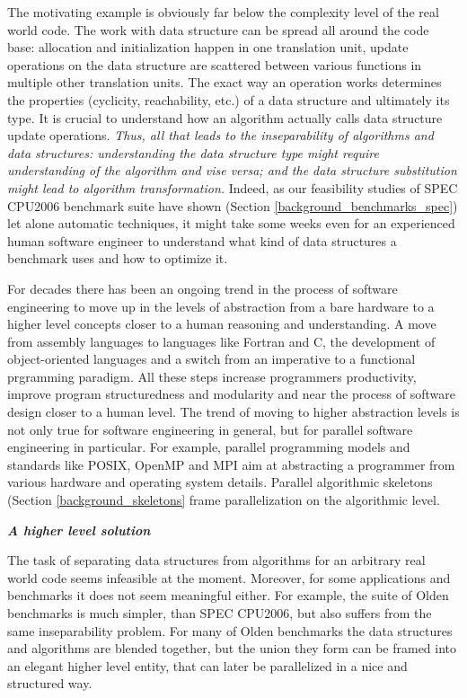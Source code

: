 \begin{description}[style=unboxed,leftmargin=0cm]
\item[\textit{Data structure and algorithm inseparability}] The motivating example is obviously far below the complexity level of the real world code. The work with data structure can be spread all around the code base: allocation and initialization happen in one translation unit, update operations on the data structure are scattered between various functions in multiple other translation units. The exact way an operation works determines the properties (cyclicity, reachability, etc.) of a data structure and ultimately its type. It is crucial to understand how an algorithm actually calls data structure update operations. \textit{Thus, all that leads to the inseparability of algorithms and data structures: understanding the data structure type might require understanding of the algorithm and vise versa; and the data structure substitution might lead to algorithm transformation.} Indeed, as our feasibility studies of SPEC CPU2006 benchmark suite have shown (Section \ref{background_benchmarks_spec}) let alone automatic techniques, it might take some weeks even for an experienced human software engineer to understand what kind of data structures a benchmark uses and how to optimize it.
\item[\textit{The ever-going trend to higher abstraction levels}] For decades there has been an ongoing trend in the process of software engineering to move up in the levels of abstraction from a bare hardware to a higher level concepts closer to a human reasoning and understanding. A move from assembly languages to languages like Fortran and C, the development of object-oriented languages and a switch from an imperative to a functional prgramming paradigm. All these steps increase programmers productivity, improve program structuredness and modularity and near the process of software design closer to a human level. The trend of moving to higher abstraction levels is not only true for software engineering in general, but for parallel software engineering in particular. For example, parallel programming models and standards like POSIX, OpenMP and MPI aim at abstracting a programmer from various hardware and operating system details. Parallel algorithmic skeletons \cite{mccool-patterns} (Section \ref{background_skeletons} frame parallelization on the algorithmic level.
\end{description}
\begin{center}
\textbf{\large \textit{A higher level solution}}
\end{center}
\quad The task of separating data structures from algorithms for an arbitrary real world code seems infeasible at the moment. Moreover, for some applications and benchmarks it does not seem meaningful either. For example, the suite of Olden benchmarks is much simpler, than SPEC CPU2006, but also suffers from the same inseparability problem. For many of Olden benchmarks the data structures and algorithms are blended together, but the union they form can be framed into an elegant higher level entity, that can later be parallelized in a nice and structured way.\newline\null

